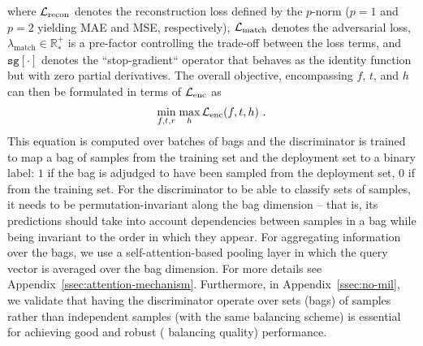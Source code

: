 %
where \( {\mathcal{L}}_{\text{recon}} \) denotes the reconstruction loss defined by the \(p\)-norm (\(p=1\)
and \(p=2\) yielding MAE and MSE, respectively), \( {\mathcal{L}}_\text{match} \) denotes the adversarial loss,
\( \lambda_\text{match} \in \mathbb{R}^+_\ast \) is a pre-factor controlling the trade-off between
the loss terms, and \( \texttt{sg}[\cdot] \) denotes the ``stop-gradient`` operator that behaves as
the identity function but with zero partial derivatives.
%
The overall objective, encompassing $f$, $t$, and $h$ can then be formulated in terms of
\( {\mathcal{L}}_\text{enc} \) as
%
\begin{align}
    \underset{f, t, r}{\textrm{min}}\; \underset{h}{\textrm{max}}\,{\mathcal{L}}_\text{enc}(f, t, h)~.
    \label{eq:disentangling_total}
\end{align}
%
This equation is computed over batches of bags and the discriminator is trained to map a bag of
samples from the training set and the deployment set to a binary label: $1$ if the bag is adjudged to
have been sampled from the deployment set, $0$ if from the training set.
For the discriminator to be able to classify sets of samples, it needs to be permutation-invariant
along the bag dimension -- that is, its predictions should take into account dependencies between
samples in a bag while being invariant to the order in which they appear. 
For aggregating information over the bags, we use a self-attention-based
\citep{vaswani2017attention} pooling layer in which the query vector is averaged over the bag
dimension.
For more details see Appendix~\ref{ssec:attention-mechanism}. 
%
Furthermore, in Appendix~\ref{ssec:no-mil}, we validate that having the discriminator operate over
sets (bags) of samples rather than independent samples (with the same balancing scheme) is
essential for achieving good and robust (\wrt{} balancing quality) performance.

